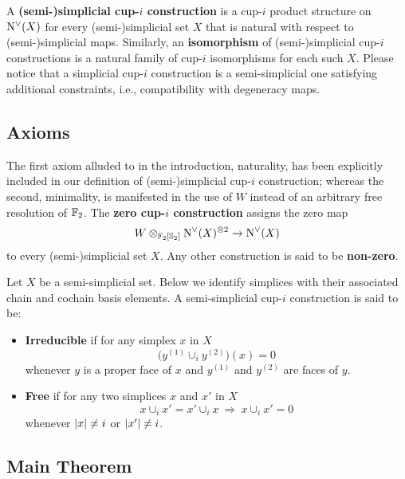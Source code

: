 A \textbf{(semi-)simplicial \mbox{cup-$i$} construction} is a \mbox{cup-$i$} product structure on $\operatorname{N^{\vee}}(X)$ for every (semi-)simplicial set $X$ that is natural with respect to (semi-)simplicial maps.
Similarly, an \textbf{isomorphism} of (semi-)simplicial \mbox{cup-$i$} constructions is a natural family of cup-$i$ isomorphisms for each such $X$.
Please notice that a simplicial \mbox{cup-$i$} construction is a semi-simplicial one satisfying additional constraints, i.e., compatibility with degeneracy maps.

\subsection{Axioms}

The first axiom alluded to in the introduction, naturality, has been explicitly included in our definition of (semi-)simplicial \mbox{cup-$i$} construction; whereas the second, minimality, is manifested in the use of $W$ instead of an arbitrary free resolution of ${\mathbb{F}_2}$.
The \textbf{zero \mbox{cup-$i$} construction} assigns the zero map
\[
W \otimes_{{\mathbb{F}_2}[\mathbb{S}_2]} \operatorname{N^{\vee}}(X)^{\otimes 2} \to \operatorname{N^{\vee}}(X)
\]
to every (semi-)simplicial set $X$.
Any other construction is said to be \textbf{non-zero}.



Let $X$ be a semi-simplicial set.
Below we identify simplices with their associated chain and cochain basis elements.
A semi-simplicial \mbox{cup-$i$} construction is said to be:
\begin{itemize}
	\item \textbf{Irreducible} if for any simplex $x$ in $X$
	\[
	\boxed{\Big( y^{(1)} \cup_{i} y^{(2)} \Big)(x) = 0}
	\]
	whenever $y$ is a proper face of $x$ and $y^{(1)}$ and $y^{(2)}$ are faces of $y$.

	\item \textbf{Free} if for any two simplices $x$ and $x'$ in $X$
	\[
	\boxed{x \cup_{i} x' = x' \cup_{i} x} \
	\Longrightarrow \
	\boxed{x \cup_{i} x' = 0}
	\]
	whenever $\lvert x\rvert \neq i$ or $\lvert x'\rvert \neq i$.
\end{itemize}

\subsection{Main Theorem}\label{ss:main_theorem}

